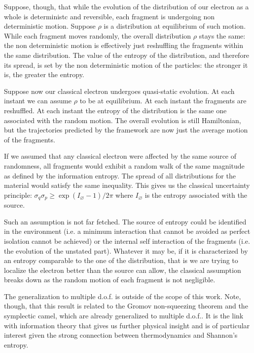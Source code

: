 \documentclass[aps,pra,10pt,twocolumn,floatfix,nofootinbib]{revtex4-1}
\numberwithin{equation}{section}
\theoremstyle{definition}
\begin{document}
Suppose, though, that while the evolution of the distribution of our electron as a whole is deterministc and reversible, each fragment is undergoing non deterministic motion. Suppose $\rho$ is a distribution at equilibrium of such motion. While each fragment moves randomly, the overall distribution $\rho$ stays the same: the non deterministic motion is effectively just reshuffling the fragments within the same distribution. The value of the entropy of the distribution, and therefore its spread, is set by the non deterministic motion of the particles: the stronger it is, the greater the entropy.

Suppose now our classical electron undergoes quasi-static evolution. At each instant we can assume $\rho$ to be at equilibrium. At each instant the fragments are reshuffled. At each instant the entropy of the distribution is the same one associated with the random motion. The overall evolution is still Hamiltonian, but the trajectories predicted by the framework are now just the average motion of the fragments. 

If we assumed that any classical electron were affected by the same source of randomness, all fragments would exhibit a random walk of the same magnitude as defined by the information entropy. The spread of all distributions for the material would satisfy the same inequality. This gives us the classical uncertainty principle: $\sigma_q\sigma_p \geq \exp (I_\varnothing - 1) / 2 \pi $ where $I_\varnothing$ is the entropy associated with the source.

Such an assumption is not far fetched. The source of entropy could be identified in the environment (i.e. a minimum interaction that cannot be avoided as perfect isolation cannot be achieved) or the internal self interaction of the fragments (i.e. the evolution of the unstated part). Whatever it may be, if it is characterized by an entropy comparable to the one of the distribution, that is we are trying to localize the electron better than the source can allow, the classical assumption breaks down as the random motion of each fragment is not negligible.

The generalization to multiple d.o.f. is outside of the scope of this work. Note, though, that this result is related to the Gromov non-squeezing theorem and the symplectic camel, which are already generalized to multiple d.o.f.. It is the link with information theory that gives us further physical insight and is of particular interest given the strong connection between thermodynamics and Shannon's entropy.
\end{document}
